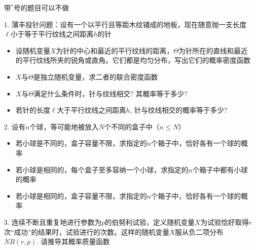 \begin{frame}

{\color{red} \scriptsize 带$^*$号的题目可以不做}

\vspace{1em}

1. 蒲丰投针问题：设有一个以平行且等距木纹铺成的地板，现在随意抛一支长度$\ell$小于等于平行纹线之间距离$h$的针
\vspace{0.6em}
\begin{itemize}
\item[(1)] 设随机变量$X$为针的中心和最近的平行纹线的距离，$\Theta$为针所在的直线和最近的平行纹线所夹的锐角或直角。它们都是均匀分布，写出它们的概率密度函数
\vspace{0.4em}
\item[(2)] $X$与$\Theta$是独立随机变量，求二者的联合密度函数
\vspace{0.4em}
\item[(3)] $X$与$\Theta$满足什么条件时，针与纹线相交? 其概率等于多少?
\vspace{0.4em}
\item[(4$^*$)] 若针的长度$\ell$大于平行纹线之间距离$h$, 针与纹线相交的概率等于多少?
\end{itemize}

\end{frame}


\begin{frame}

2. 设有$n$个球，等可能地被放入$N$个不同的盒子中（$n \le N$）
\vspace{0.6em}
\begin{itemize}
\item[(1)] 若小球是不同的，盒子容量不限，求指定的$n$个箱子中，恰好各有一个球的概率
\vspace{0.4em}
\item[(2)] 若小球是相同的，每个盒子至多容纳一个小球，求指定的$n$个箱子中都有小球的概率
\vspace{0.4em}
\item[(3)] 若小球是相同的，盒子容量不限，求指定的$n$个箱子中，恰好各有一个球的概率
\end{itemize}

\vspace{1em}

3. 连续不断且重复地进行参数为$p$的伯努利试验，定义随机变量$X$为试验恰好取得$r$次``成功''的结果时，试验进行的次数。这样的随机变量$X$服从负二项分布$NB(r,p)$. 请推导其概率质量函数

\end{frame}

